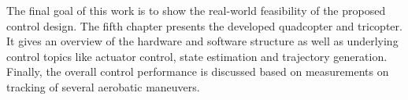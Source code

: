 The final goal of this work is to show the real-world feasibility of the proposed control design.
The fifth chapter presents the developed quadcopter and tricopter.
It gives an overview of the hardware and software structure as well as underlying control topics like actuator control, state estimation and trajectory generation.
Finally, the overall control performance is discussed based on measurements on tracking of several aerobatic maneuvers.
